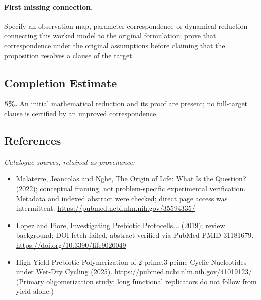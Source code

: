 \documentclass[11pt]{article}
\begin{document}
\paragraph{First missing connection.} Specify an observation map, parameter correspondence or dynamical reduction connecting this worked model to the original formulation; prove that correspondence under the original assumptions before claiming that the proposition resolves a clause of the target.
\subsection{Completion Estimate}
\textbf{5\%.} An initial mathematical reduction and its proof are present; no full-target clause is certified by an unproved correspondence.
\subsection{References}
\noindent\emph{Catalogue sources, retained as provenance:}
\begin{itemize}
\item Malaterre, Jeancolas and Nghe, The Origin of Life: What Is the Question? (2022); conceptual framing, not problem-specific experimental verification. Metadata and indexed abstract were checked; direct page access was intermittent. \url{https://pubmed.ncbi.nlm.nih.gov/35594335/}
\item Lopez and Fiore, Investigating Prebiotic Protocells... (2019); review background; DOI fetch failed, abstract verified via PubMed PMID 31181679. \url{https://doi.org/10.3390/life9020049}
\item High-Yield Prebiotic Polymerization of 2-prime,3-prime-Cyclic Nucleotides under Wet-Dry Cycling (2025). \url{https://pubmed.ncbi.nlm.nih.gov/41019123/} (Primary oligomerization study; long functional replicators do not follow from yield alone.)
\end{itemize}
\end{document}
